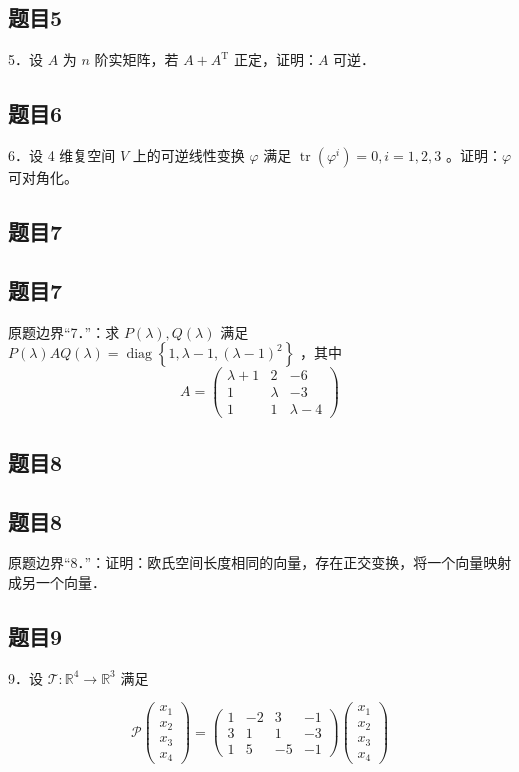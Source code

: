 \documentclass{article}
\begin{document}
\subsection{题目5}
5．设 \(A\) 为 \(n\) 阶实矩阵，若 \(A+A^{\mathrm{T}}\) 正定，证明：\(A\) 可逆．

\subsection{题目6}
6．设 4 维复空间 \(V\) 上的可逆线性变换 \(\varphi\) 满足 \(\operatorname{tr}\left(\varphi^{i}\right)=0, i=1,2,3\) 。证明：\(\varphi\) 可对角化。

\begin{itemize}

\subsection{题目7}
\end{itemize}

\subsection{题目7}
原题边界“7．”：求 \(P(\lambda), Q(\lambda)\) 满足 \(P(\lambda) A Q(\lambda)=\operatorname{diag}\left\{1, \lambda-1,(\lambda-1)^{2}\right\}\) ，其中
\[
A=\left(\begin{array}{ccc}
\lambda+1 & 2 & -6 \\
1 & \lambda & -3 \\
1 & 1 & \lambda-4
\end{array}\right)
\]

\subsection{题目8}

\subsection{题目8}
原题边界“8．”：证明：欧氏空间长度相同的向量，存在正交变换，将一个向量映射成另一个向量．

\subsection{题目9}
9．设 \(\mathcal{T}: \mathbb{R}^{4} \rightarrow \mathbb{R}^{3}\) 满足

\[
\mathcal{P}\left(\begin{array}{l}
x_{1} \\
x_{2} \\
x_{3} \\
x_{4}
\end{array}\right)=\left(\begin{array}{cccc}
1 & -2 & 3 & -1 \\
3 & 1 & 1 & -3 \\
1 & 5 & -5 & -1
\end{array}\right)\left(\begin{array}{l}
x_{1} \\
x_{2} \\
x_{3} \\
x_{4}
\end{array}\right)
\]
\end{document}

